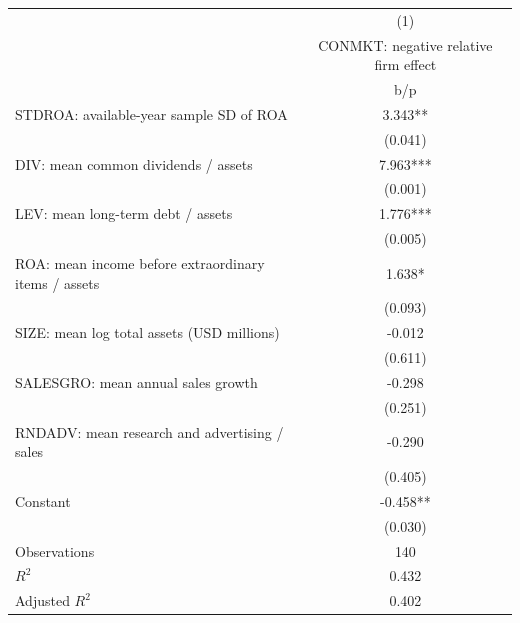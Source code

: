 {
\def\sym#1{\ifmmode^{#1}\else\(^{#1}\)\fi}
\begin{tabular}{l*{1}{c}}
\hline\hline
                    &\multicolumn{1}{c}{(1)}\\
                    &\multicolumn{1}{c}{CONMKT: negative relative firm effect}\\
                    &         b/p   \\
\hline
STDROA: available-year sample SD of ROA&       3.343** \\
                    &     (0.041)   \\
DIV: mean common dividends / assets&       7.963***\\
                    &     (0.001)   \\
LEV: mean long-term debt / assets&       1.776***\\
                    &     (0.005)   \\
ROA: mean income before extraordinary items / assets&       1.638*  \\
                    &     (0.093)   \\
SIZE: mean log total assets (USD millions)&      -0.012   \\
                    &     (0.611)   \\
SALESGRO: mean annual sales growth&      -0.298   \\
                    &     (0.251)   \\
RNDADV: mean research and advertising / sales&      -0.290   \\
                    &     (0.405)   \\
Constant            &      -0.458** \\
                    &     (0.030)   \\
\hline
Observations        &         140   \\
\(R^{2}\)           &       0.432   \\
Adjusted \(R^{2}\)  &       0.402   \\
\hline\hline
\end{tabular}
}
